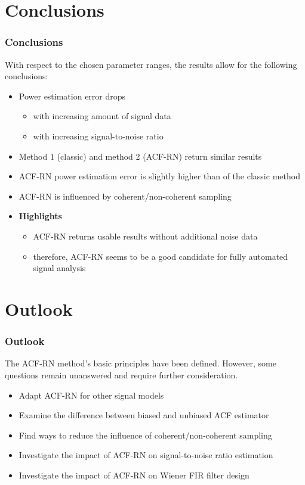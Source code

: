 \documentclass[11pt,aspectratio=169]{beamer}
\begin{document}
	\section{Conclusions}
	\begin{frame}
		\frametitle{Conclusions}
		With respect to the chosen parameter ranges, the results allow for the following conclusions:
		\vspace*{1em}
		\begin{itemize}
			\item Power estimation error drops
			\begin{itemize}
				\item with increasing amount of signal data
				\item with increasing signal-to-noise ratio
			\end{itemize}
			\item Method 1 (classic) and method 2 (ACF-RN) return similar results
			\item ACF-RN power estimation error is slightly higher than of the classic method
			\item ACF-RN is influenced by coherent/non-coherent sampling
			\item \textbf{Highlights}
			\begin{itemize}
				\item ACF-RN returns usable results without additional noise data
				\item therefore, ACF-RN seems to be a good candidate for fully automated signal analysis
			\end{itemize}
		\end{itemize}
	\end{frame}
	\section{Outlook}
	\begin{frame}
		\frametitle{Outlook}
		The ACF-RN method's basic principles have been defined. However, some questions remain unanswered and require further consideration.
		\vspace*{1em}
		\begin{itemize}
			\item Adapt ACF-RN for other signal models
			\item Examine the difference between biased and unbiased ACF estimator
			\item Find ways to reduce the influence of coherent/non-coherent sampling
			\item Investigate the impact of ACF-RN on signal-to-noise ratio estimation
			\item Investigate the impact of ACF-RN on Wiener FIR filter design
		\end{itemize}
	\end{frame}
\end{document}
